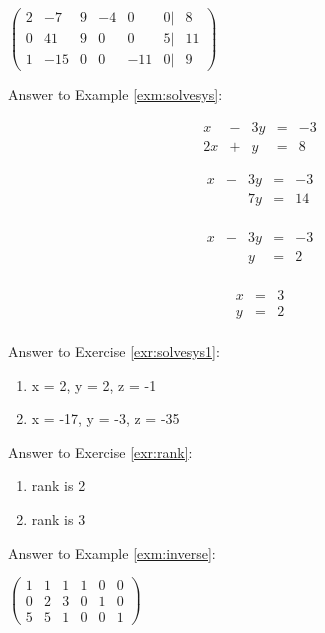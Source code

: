 \documentclass[
]{book}
\theoremstyle{definition}
\theoremstyle{definition}
\theoremstyle{definition}
\theoremstyle{definition}
\theoremstyle{remark}
\begin{document}
\(\begin{pmatrix}  2 & -7 & 9 & -4 & 0 & 0| & 8\\  0 & 41 & 9 & 0 & 0 & 5 | & 11\\  1 & -15 & 0 & 0 & -11 & 0 | & 9  \end{pmatrix}\)

Answer to Example \ref{exm:solvesys}:

\[\begin{matrix}
            x  & - & 3y & = & -3\\
            2x & + &  y & = &  8
            \end{matrix}\]

\[\begin{matrix}
            x  & - & 3y & = & -3\\
               &   & 7y & = & 14\\          
            \end{matrix}\]

\[\begin{matrix}
            x  & - & 3y & = & -3\\
               &   & y & = & 2\\            
            \end{matrix}\]

\[\begin{matrix}
            x & = & 3\\
            y & = & 2\\         
            \end{matrix}\]

Answer to Exercise \ref{exr:solvesys1}:

\begin{enumerate}
\def\labelenumi{\arabic{enumi}.}
\item
  x = 2, y = 2, z = -1
\item
  x = -17, y = -3, z = -35
\end{enumerate}

Answer to Exercise \ref{exr:rank}:

\begin{enumerate}
\def\labelenumi{\arabic{enumi}.}
\item
  rank is 2
\item
  rank is 3
\end{enumerate}

Answer to Example \ref{exm:inverse}:

\(\left(\begin{array}{ccc|ccc}  1&1&1&1&0&0\\  0&2&3&0&1&0\\  5&5&1&0&0&1 \end{array} \right)\)
\end{document}
